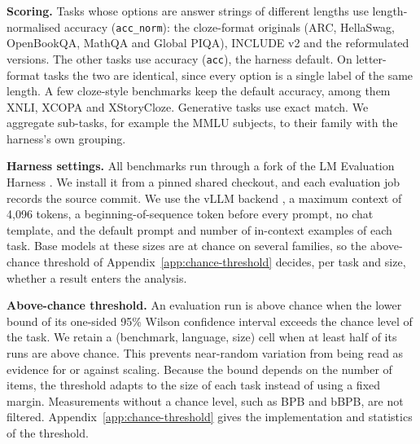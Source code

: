 \textbf{Scoring.} Tasks whose options are answer strings of different lengths use length-normalised accuracy (\texttt{acc\_norm}): the cloze-format originals (ARC, HellaSwag, OpenBookQA, MathQA and Global PIQA), INCLUDE v2 and the reformulated versions. The other tasks use accuracy (\texttt{acc}), the harness default. On letter-format tasks the two are identical, since every option is a single label of the same length. A few cloze-style benchmarks keep the default accuracy, among them XNLI, XCOPA and XStoryCloze. Generative tasks use exact match. We aggregate sub-tasks, for example the MMLU subjects, to their family with the harness's own grouping.

\textbf{Harness settings.} All benchmarks run through a fork of the LM Evaluation Harness \citep{gao_framework_2021}. We install it from a pinned shared checkout, and each evaluation job records the source commit. We use the vLLM backend \citep{kwon_efficient_2023}, a maximum context of 4,096 tokens, a beginning-of-sequence token before every prompt, no chat template, and the default prompt and number of in-context examples of each task. Base models at these sizes are at chance on several families, so the above-chance threshold of Appendix~\ref{app:chance-threshold} decides, per task and size, whether a result enters the analysis.

\textbf{Above-chance threshold.} An evaluation run is above chance when the lower bound of its one-sided 95\% Wilson confidence interval exceeds the chance level of the task. We retain a (benchmark, language, size) cell when at least half of its runs are above chance. This prevents near-random variation from being read as evidence for or against scaling. Because the bound depends on the number of items, the threshold adapts to the size of each task instead of using a fixed margin. Measurements without a chance level, such as BPB and bBPB, are not filtered. Appendix~\ref{app:chance-threshold} gives the implementation and statistics of the threshold.


